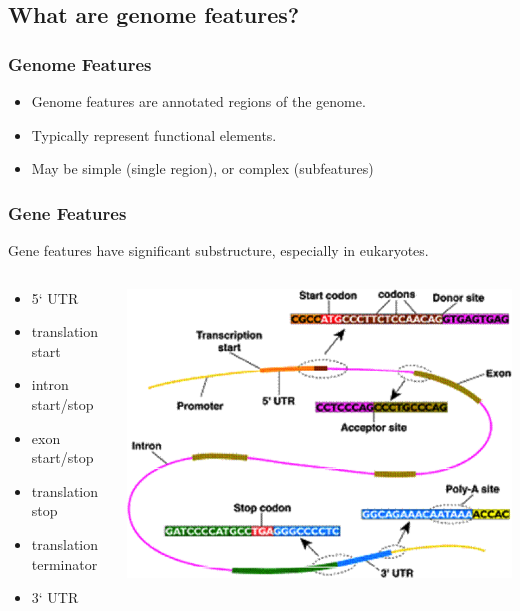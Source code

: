 

\subsection{What are genome features?}

\begin{frame}
  \frametitle{Genome Features}
  \begin{itemize}
    \item Genome features are annotated regions of the genome.
    \item Typically represent functional elements.
    \item May be simple (single region), or complex (subfeatures)
  \end{itemize}
\end{frame}

\begin{frame}
  \frametitle{Gene Features}
  Gene features have significant substructure, especially in eukaryotes.
  \begin{columns}[T]
    \begin{column}{4cm}
      \begin{itemize}
      \item 5` UTR
        \item translation start
        \item intron start/stop
        \item exon start/stop
        \item translation stop
        \item translation terminator
        \item 3` UTR
      \end{itemize}
    \end{column}
    \begin{column}{6cm}
      \includegraphics[width=1\textwidth]{images/eukaryotic_gene}
    \end{column}
  \end{columns}       
\end{frame}

